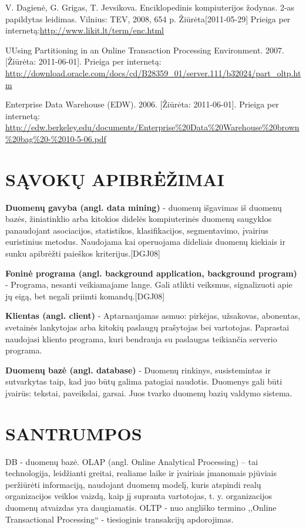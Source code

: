 \documentclass[12pt,a4paper,titlepage]{article}
\begin{document}
\begin{thebibliography}{99}
V. Dagienė, G. Grigas, T. Jevsikova. Enciklopedinis kompiuterijos žodynas. 2-as papildytas leidimas. Vilnius: TEV, 2008, 654 p. Žiūrėta[2011-05-29] Prieiga per internetą:\url{http://www.likit.lt/term/enc.html}

 UUsing Partitioning in an Online Transaction Processing Environment. 2007. [Žiūrėta: 2011-06-01]. Prieiga per internetą: \url{http://download.oracle.com/docs/cd/B28359_01/server.111/b32024/part_oltp.htm}
 
Enterprise Data Warehouse (EDW). 2006. [Žiūrėta: 2011-06-01]. Prieiga per internetą: \url{http://edw.berkeley.edu/documents/Enterprise%20Data%20Warehouse%20brown%20bag%20-%2010-5-06.pdf}

\end{thebibliography}

\section*{SĄVOKŲ APIBRĖŽIMAI}

\textbf{Duomenų gavyba (angl. data mining)} - duomenų išgavimas iš duomenų bazės, žiniatinklio arba kitokios didelės kompiuterinės duomenų saugyklos panaudojant asociacijos, statistikos, klasifikacijos, segmentavimo, įvairius euristinius metodus. Naudojama kai operuojama dideliais duomenų kiekiais ir sunku apibrėžti paieškos kriterijus.[DGJ08]

\textbf{Foninė programa (angl. background application, background program)} - Programa, nesanti veikiamajame lange.
Gali atlikti veiksmus, signalizuoti apie jų eigą, bet negali priimti komandų.[DGJ08]

\textbf{Klientas (angl. client)} - Aptarnaujamas asmuo: pirkėjas, užsakovas, abonentas, svetainės lankytojas arba kitokių paslaugų prašytojas bei vartotojas. Paprastai naudojasi kliento programa, kuri bendrauja su paslaugas teikiančia serverio programa.

\textbf{Duomenų bazė (angl. database)} - Duomenų rinkinys, susistemintas ir sutvarkytas taip, kad juo būtų galima patogiai naudotis. Duomenys gali būti įvairūs: tekstai, paveikslai, garsai. Juos tvarko duomenų bazių valdymo sistema.

\section*{SANTRUMPOS}
DB - duomenų bazė.
OLAP (angl. Online Analytical Processing) – tai technologija, leidžianti greitai, realiame laike ir įvairiais įmanomais pjūviais peržiūrėti informaciją, naudojant duomenų modelį, kuris atspindi realų organizacijos veiklos vaizdą, kaip jį supranta vartotojas, t. y. organizacijos duomenų atvaizdas yra daugiamatis.
OLTP - nuo angliško termino ,,Online Transactional Processing`` - tiesioginis transakcijų apdorojimas.
\end{document}
